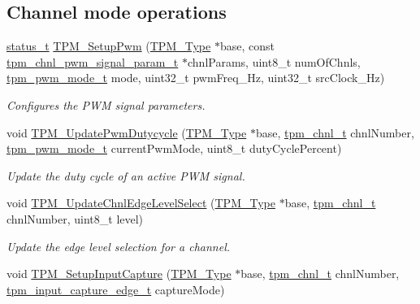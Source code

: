 \subsection*{Channel mode operations}
\begin{DoxyCompactItemize}
\item 
\mbox{\hyperlink{group__ksdk__common_gaaabdaf7ee58ca7269bd4bf24efcde092}{status\+\_\+t}} \mbox{\hyperlink{group__tpm_gad52f4e6f23ba1d127f5d5f3f30b49dbd}{T\+P\+M\+\_\+\+Setup\+Pwm}} (\mbox{\hyperlink{struct_t_p_m___type}{T\+P\+M\+\_\+\+Type}} $\ast$base, const \mbox{\hyperlink{group__tpm_ga19383e0a3baf4033a37e96df9016ab1c}{tpm\+\_\+chnl\+\_\+pwm\+\_\+signal\+\_\+param\+\_\+t}} $\ast$chnl\+Params, uint8\+\_\+t num\+Of\+Chnls, \mbox{\hyperlink{group__tpm_ga3575f319c9fbc1aa574a1054c14e7dab}{tpm\+\_\+pwm\+\_\+mode\+\_\+t}} mode, uint32\+\_\+t pwm\+Freq\+\_\+\+Hz, uint32\+\_\+t src\+Clock\+\_\+\+Hz)
\begin{DoxyCompactList}\small\item\em Configures the P\+WM signal parameters. \end{DoxyCompactList}\item 
void \mbox{\hyperlink{group__tpm_ga7f205d02e27dd8d0b5780203d30e52a4}{T\+P\+M\+\_\+\+Update\+Pwm\+Dutycycle}} (\mbox{\hyperlink{struct_t_p_m___type}{T\+P\+M\+\_\+\+Type}} $\ast$base, \mbox{\hyperlink{group__tpm_gacda6962369e014c8ac72d1b58b224deb}{tpm\+\_\+chnl\+\_\+t}} chnl\+Number, \mbox{\hyperlink{group__tpm_ga3575f319c9fbc1aa574a1054c14e7dab}{tpm\+\_\+pwm\+\_\+mode\+\_\+t}} current\+Pwm\+Mode, uint8\+\_\+t duty\+Cycle\+Percent)
\begin{DoxyCompactList}\small\item\em Update the duty cycle of an active P\+WM signal. \end{DoxyCompactList}\item 
void \mbox{\hyperlink{group__tpm_ga6406c3ca4df37694a44078f12b103954}{T\+P\+M\+\_\+\+Update\+Chnl\+Edge\+Level\+Select}} (\mbox{\hyperlink{struct_t_p_m___type}{T\+P\+M\+\_\+\+Type}} $\ast$base, \mbox{\hyperlink{group__tpm_gacda6962369e014c8ac72d1b58b224deb}{tpm\+\_\+chnl\+\_\+t}} chnl\+Number, uint8\+\_\+t level)
\begin{DoxyCompactList}\small\item\em Update the edge level selection for a channel. \end{DoxyCompactList}\item 
void \mbox{\hyperlink{group__tpm_ga400726db4285f60d8c2788ab62d01f13}{T\+P\+M\+\_\+\+Setup\+Input\+Capture}} (\mbox{\hyperlink{struct_t_p_m___type}{T\+P\+M\+\_\+\+Type}} $\ast$base, \mbox{\hyperlink{group__tpm_gacda6962369e014c8ac72d1b58b224deb}{tpm\+\_\+chnl\+\_\+t}} chnl\+Number, \mbox{\hyperlink{group__tpm_ga5bcbd71358fe69e564786631827f7db1}{tpm\+\_\+input\+\_\+capture\+\_\+edge\+\_\+t}} capture\+Mode)

\end{DoxyCompactItemize}
